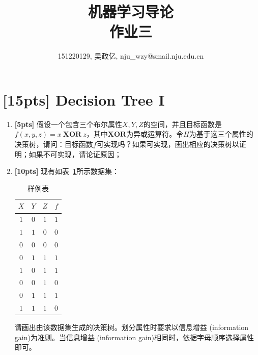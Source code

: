 \documentclass[a4paper,UTF8]{article}
\numberwithin{equation}{section}
\begin{document}
\title{机器学习导论\\
作业三}
\author{151220129, 吴政亿, nju\_wzy@smail.nju.edu.cn}
\maketitle



\section{[15pts] Decision Tree I}

\begin{enumerate}[ {(}1{)}]
	\item \textbf{[5pts]} 假设一个包含三个布尔属性${X, Y, Z}$的空间，并且目标函数是$f(x,y,z) = x\ \mathbf{XOR}\ z$，其中$\mathbf{XOR}$为异或运算符。令$H$为基于这三个属性的决策树，请问：目标函数$f$可实现吗？如果可实现，画出相应的决策树以证明；如果不可实现，请论证原因；
	
	\item \textbf{[10pts]} 现有如表~\ref{table:ranking}所示数据集：
	
	\begin{table}[!h]
		\centering
		\caption{样例表} \vspace{2mm}\label{table:ranking}
		\begin{tabular}{c c c|c}\hline
			$X$ & $Y$ & $Z$ & $f$ \\
			\hline
			$1$ & $0$  & $1$ &  $1$\\
			$1$ & $1$  & $0$ &  $0$\\
			$0$ & $0$  & $0$ &  $0$\\
			$0$ & $1$  & $1$ &  $1$\\
			$1$ & $0$  & $1$ &  $1$\\
			$0$ & $0$  & $1$ &  $0$\\
			$0$ & $1$  & $1$ &  $1$\\
			$1$ & $1$  & $1$ &  $0$\\
			\hline
		\end{tabular}
	\end{table}
	
	请画出由该数据集生成的决策树。划分属性时要求以信息增益 (information gain)为准则。当信息增益 (information gain)相同时，依据字母顺序选择属性即可。
\end{enumerate}
\end{document}
